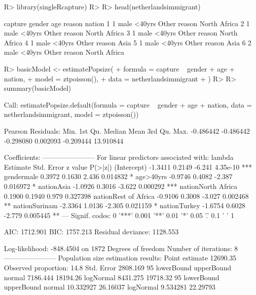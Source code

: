 \documentclass[
]{jss}
\newcommand{\1}{\mathmybb{1}} \newcommand{\bx}{\boldsymbol{x}}
\begin{document}
\begin{CodeChunk}
\begin{CodeInput}
R> library(singleRcapture)
R> 
R> head(netherlandsimmigrant)
\end{CodeInput}
\begin{CodeOutput}
  capture gender    age       reason       nation
1       1   male <40yrs Other reason North Africa
2       1   male <40yrs Other reason North Africa
3       1   male <40yrs Other reason North Africa
4       1   male <40yrs Other reason         Asia
5       1   male <40yrs Other reason         Asia
6       2   male <40yrs Other reason North Africa
\end{CodeOutput}
\end{CodeChunk}

\begin{CodeChunk}
\begin{CodeInput}
R> basicModel <- estimatePopsize(
+   formula = capture ~ gender + age + nation,
+   model   = ztpoisson(),
+   data    = netherlandsimmigrant
+ )
R> 
R> summary(basicModel)
\end{CodeInput}
\begin{CodeOutput}

Call:
estimatePopsize.default(formula = capture ~ gender + age + nation, 
    data = netherlandsimmigrant, model = ztpoisson())

Pearson Residuals:
     Min.   1st Qu.    Median      Mean   3rd Qu.      Max. 
-0.486442 -0.486442 -0.298080  0.002093 -0.209444 13.910844 

Coefficients:
-----------------------
For linear predictors associated with: lambda 
                     Estimate Std. Error z value  P(>|z|)    
(Intercept)           -1.3411     0.2149  -6.241 4.35e-10 ***
gendermale             0.3972     0.1630   2.436 0.014832 *  
age>40yrs             -0.9746     0.4082  -2.387 0.016972 *  
nationAsia            -1.0926     0.3016  -3.622 0.000292 ***
nationNorth Africa     0.1900     0.1940   0.979 0.327398    
nationRest of Africa  -0.9106     0.3008  -3.027 0.002468 ** 
nationSurinam         -2.3364     1.0136  -2.305 0.021159 *  
nationTurkey          -1.6754     0.6028  -2.779 0.005445 ** 
---
Signif. codes:  0 '***' 0.001 '**' 0.01 '*' 0.05 '.' 0.1 ' ' 1

AIC: 1712.901
BIC: 1757.213
Residual deviance: 1128.553

Log-likelihood: -848.4504 on 1872 Degrees of freedom 
Number of iterations: 8
-----------------------
Population size estimation results: 
Point estimate 12690.35
Observed proportion: 14.8%
Std. Error 2808.169
95%
          lowerBound upperBound
normal      7186.444   18194.26
logNormal   8431.275   19718.32
95%
          lowerBound upperBound
normal     10.332927   26.16037
logNormal   9.534281   22.29793
\end{CodeOutput}
\end{CodeChunk}
\end{document}
